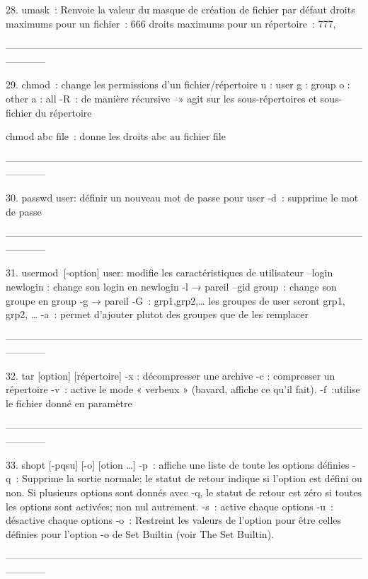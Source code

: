 \documentclass[a4paper, 10pt, onecolumn, openright, oneside]{book}
\begin{document}
    28. umask : Renvoie la valeur du masque de création de fichier par défaut
droits maximums pour un fichier : 666
droits maximums pour un répertoire : 777,

------------------------------------------------------------------------------------------------------------------------

    29. chmod : change les permissions d'un fichier/répertoire
u : user
g : group
o : other
a : all
-R : de manière récursive --» agit sur les sous-répertoires et sous-fichier du répertoire

chmod abc file : donne les droits abc au fichier file

------------------------------------------------------------------------------------------------------------------------

    30. passwd user: définir un nouveau mot de passe pour user
-d : supprime le mot de passe

------------------------------------------------------------------------------------------------------------------------

    31. usermod [-option] user: modifie les caractéristiques de utilisateur
--login newlogin : change son login en newlogin
-l → pareil 
--gid group : change son groupe en group
-g → pareil
-G : grp1,grp2,… les groupes de user seront grp1, grp2, …
-a : permet d’ajouter plutot des groupes que de les remplacer 

------------------------------------------------------------------------------------------------------------------------

    32. tar [option] [répertoire] 
-x : décompresser une archive
-c : compresser un répertoire
-v : active le mode « verbeux » (bavard, affiche ce qu'il fait). 
-f :utilise le fichier donné en paramètre

------------------------------------------------------------------------------------------------------------------------

    33. shopt [-pqsu] [-o] [otion …]
-p : affiche une liste de toute les options définies
-q : Supprime la sortie normale; le statut de retour indique si l'option est défini ou non. Si plusieurs options sont donnés avec -q, le statut de retour est zéro si toutes les options sont activées; non nul autrement.
-s : active chaque options
-u : désactive chaque options
-o : Restreint les valeurs de l'option pour être celles définies pour l'option -o de Set Builtin (voir 
The Set Builtin).

------------------------------------------------------------------------------------------------------------------------
\end{document}
